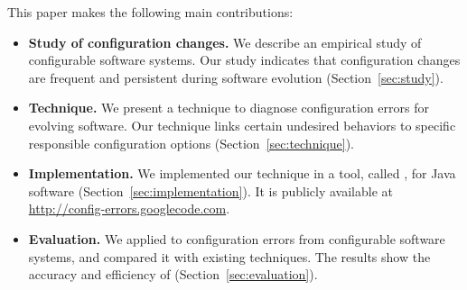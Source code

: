 This paper makes the following main contributions:

\begin{itemize}
\vspace{-3mm}
\item \textbf{Study of configuration changes.} We describe an empirical
study of \studysubjnum configurable software systems.
Our study indicates that configuration changes
are frequent and persistent during software evolution (Section~\ref{sec:study}).

\item \textbf{Technique.} We present a technique to diagnose
configuration errors for evolving software. Our technique
links certain undesired behaviors to
specific responsible configuration options (Section~\ref{sec:technique}).

\item \textbf{Implementation.} We implemented our technique
in a tool, called \ourtool, for Java software (Section~\ref{sec:implementation}).
It is publicly available at \url{http://config-errors.googlecode.com}.

\item \textbf{Evaluation.} We applied \ourtool to \errornum configuration
errors from \subjnum configurable software systems,
and compared it with existing techniques.
The results show the accuracy and efficiency of \ourtool (Section~\ref{sec:evaluation}).
\end{itemize}

